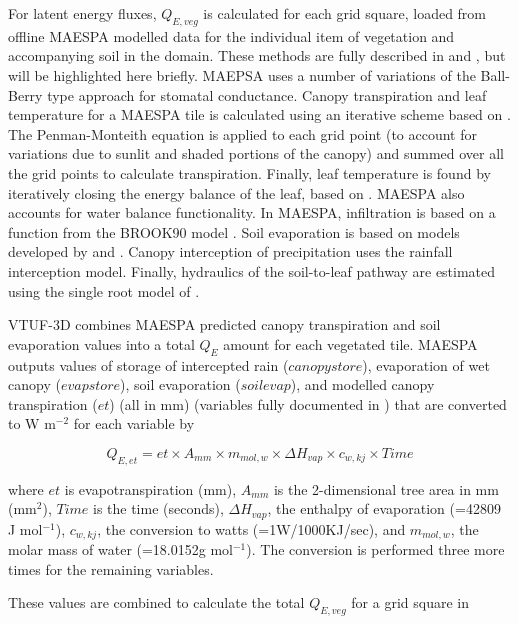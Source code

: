 \documentclass[final,3p,times,authoryear]{elsarticle}
\begin{document}
For latent energy fluxes, $Q_{E,veg}$ is calculated for each grid square, loaded from offline MAESPA modelled data for the individual item of vegetation and accompanying soil in the domain.
These methods are fully described in \cite{Duursma2012} and \cite{Medlyn2007}, but will be highlighted here briefly. MAEPSA uses a number of variations of the Ball-Berry type approach \citep{Ball1987,Duursma2012} for stomatal conductance. Canopy transpiration and leaf temperature for a MAESPA tile is calculated using an iterative scheme based on \cite{Wang1998}. The Penman-Monteith equation \citep{Penman1948,Monteith1965} is applied to each grid point (to account for variations due to sunlit and shaded portions of the canopy) and summed over all the grid points to calculate transpiration. Finally, leaf temperature is found by iteratively closing the energy balance of the leaf, based on \cite{Wang1998}. MAESPA also accounts for water balance functionality. In MAESPA, infiltration is based on a function from the BROOK90 model \citep{Federer2003}. Soil evaporation is based on models developed by \cite{Choudhury1988} and \cite{Williams2001}. Canopy interception of precipitation uses the \cite{Rutter1975} rainfall interception model. Finally, hydraulics of the soil-to-leaf pathway are estimated using the single root model of \cite{Gardner1960}.

VTUF-3D combines MAESPA predicted canopy transpiration and soil evaporation values into a total $Q_{E}$ amount for each vegetated tile. MAESPA outputs values of storage of intercepted rain ($canopystore$), evaporation of wet canopy ($evapstore$), soil evaporation ($soilevap$), and modelled canopy transpiration ($et$) (all in mm) (variables fully documented in \cite{Duursma2016}) that are converted to W m$^{-2}$ for each variable by 

\begin{equation}\label{eq:mmtowm2} 
  Q_{E,et} = et \times A _{mm} \times m_{mol,w} \times \Delta H_{vap} \times c_{w,kj} \times Time  
\end{equation} 
 
where $et$ is evapotranspiration (mm), $A _{mm}$ is the 2-dimensional tree area in mm (mm$^{2}$), $Time$ is the time (seconds), $\Delta H_{vap}$, the enthalpy of evaporation (=42809 J mol$^{-1}$), $c_{w,kj}$, the conversion to watts (=1W/1000KJ/sec), and $m_{mol,w}$, the molar mass of water (=18.0152g mol$^{-1}$). The conversion is performed three more times for the remaining variables.

These values are combined to calculate the total $Q_{E,veg}$ for a grid square in 
\end{document}
